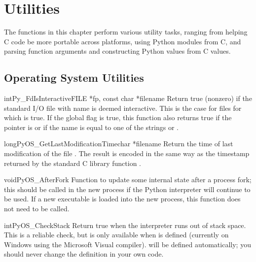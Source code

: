 \chapter{Utilities \label{utilities}}

The functions in this chapter perform various utility tasks, ranging
from helping C code be more portable across platforms, using Python
modules from C, and parsing function arguments and constructing Python
values from C values.


\section{Operating System Utilities \label{os}}

\begin{cfuncdesc}{int}{Py_FdIsInteractive}{FILE *fp, const char *filename}
  Return true (nonzero) if the standard I/O file  with name
   is deemed interactive.  This is the case for files
  for which  is true.  If the global
  flag  is true, this function also returns
  true if the  pointer is \NULL{} or if the name is
  equal to one of the strings  or .
\end{cfuncdesc}

\begin{cfuncdesc}{long}{PyOS_GetLastModificationTime}{char *filename}
  Return the time of last modification of the file .
  The result is encoded in the same way as the timestamp returned by
  the standard C library function .
\end{cfuncdesc}

\begin{cfuncdesc}{void}{PyOS_AfterFork}{}
  Function to update some internal state after a process fork; this
  should be called in the new process if the Python interpreter will
  continue to be used.  If a new executable is loaded into the new
  process, this function does not need to be called.
\end{cfuncdesc}

\begin{cfuncdesc}{int}{PyOS_CheckStack}{}
  Return true when the interpreter runs out of stack space.  This is a
  reliable check, but is only available when 
  is defined (currently on Windows using the Microsoft Visual \Cpp{}
  compiler).   will be
  defined automatically; you should never change the definition in
  your own code.
\end{cfuncdesc}

